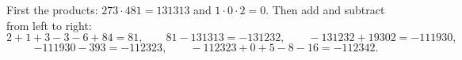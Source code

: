 First the products: $273\cdot481=131313$ and $1\cdot0\cdot2=0$. Then add and subtract from left to right:
\[2+1+3-3-6+84=81,\qquad 81-131313=-131232,\qquad -131232+19302=-111930,\]
\[-111930-393=-112323,\qquad -112323+0+5-8-16=\boxed{-112342}.\]
